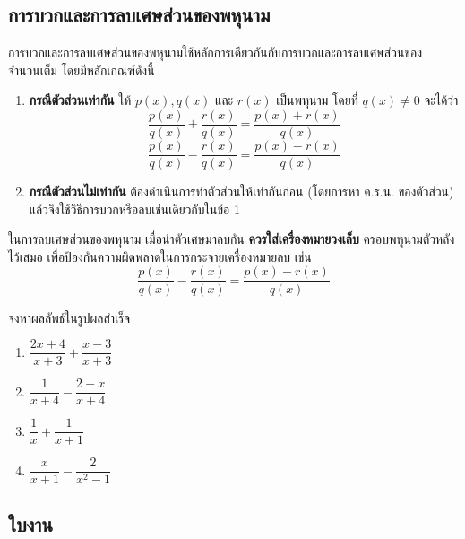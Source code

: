    \subsection*{การบวกและการลบเศษส่วนของพหุนาม}
การบวกและการลบเศษส่วนของพหุนามใช้หลักการเดียวกันกับการบวกและการลบเศษส่วนของจำนวนเต็ม โดยมีหลักเกณฑ์ดังนี้
\begin{conceptbox}
	\begin{enumerate}[label=\arabic*), leftmargin=2.5em]
    \item \textbf{กรณีตัวส่วนเท่ากัน} 
    ให้ $p(x), q(x)$ และ $r(x)$ เป็นพหุนาม โดยที่ $q(x) \neq 0$ จะได้ว่า
    \[ \dfrac{p(x)}{q(x)} + \dfrac{r(x)}{q(x)} = \dfrac{p(x) + r(x)}{q(x)} \]
    \[ \dfrac{p(x)}{q(x)} - \dfrac{r(x)}{q(x)} = \dfrac{p(x) - r(x)}{q(x)} \]
    \item \textbf{กรณีตัวส่วนไม่เท่ากัน} 
    ต้องดำเนินการทำตัวส่วนให้เท่ากันก่อน (โดยการหา ค.ร.น. ของตัวส่วน) แล้วจึงใช้วิธีการบวกหรือลบเช่นเดียวกับในข้อ 1
\end{enumerate}
\end{conceptbox}

 ในการลบเศษส่วนของพหุนาม เมื่อนำตัวเศษมาลบกัน \textbf{ควรใส่เครื่องหมายวงเล็บ} ครอบพหุนามตัวหลังไว้เสมอ เพื่อป้องกันความผิดพลาดในการกระจายเครื่องหมายลบ เช่น
\[ \dfrac{p(x)}{q(x)} - \dfrac{r(x)}{q(x)} = \dfrac{p(x) - r(x)}{q(x)} \]

\newpage
\begin{examplebox}
	จงหาผลลัพธ์ในรูปผลสำเร็จ
	\begin{enumerate}[label=\arabic*), leftmargin=2.5em]
		\item $\dfrac{2x+4}{x+3} + \dfrac{x-3}{x+3}$
		\item $\dfrac{1}{x+4} - \dfrac{2-x}{x+4}$
		\item $\dfrac{1}{x} + \dfrac{1}{x+1}$
		\item $\dfrac{x}{x+1} - \dfrac{2}{x^2-1}$
	\end{enumerate}  
\end{examplebox}
\solution

\newpage

\subsection*{ใบงาน}

